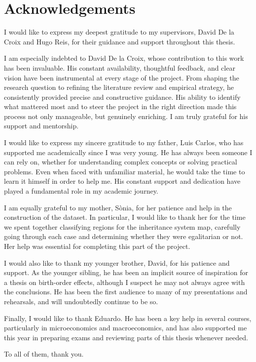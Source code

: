 \setcounter{section}{2}
\section*{Acknowledgements}

I would like to express my deepest gratitude to my supervisors, David De la Croix and Hugo Reis, for their guidance and support throughout this thesis.

I am especially indebted to David De la Croix, whose contribution to this work has been invaluable. His constant availability, thoughtful feedback, and clear vision have been instrumental at every stage of the project. From shaping the research question to refining the literature review and empirical strategy, he consistently provided precise and constructive guidance. His ability to identify what mattered most and to steer the project in the right direction made this process not only manageable, but genuinely enriching. I am truly grateful for his support and mentorship.


I would like to express my sincere gratitude to my father, Luis Carlos, who has supported me academically since I was very young. He has always been someone I can rely on, whether for understanding complex concepts or solving practical problems. Even when faced with unfamiliar material, he would take the time to learn it himself in order to help me. His constant support and dedication have played a fundamental role in my academic journey.

I am equally grateful to my mother, Sònia, for her patience and help in the construction of the dataset. In particular, I would like to thank her for the time we spent together classifying regions for the inheritance system map, carefully going through each case and determining whether they were egalitarian or not. Her help was essential for completing this part of the project.

I would also like to thank my younger brother, David, for his patience and support. As the younger sibling, he has been an implicit source of inspiration for a thesis on birth-order effects, although I suspect he may not always agree with the conclusions. He has been the first audience to many of my presentations and rehearsals, and will undoubtedly continue to be so. 

Finally, I would like to thank Eduardo. He has been a key help in several courses, particularly in microeconomics and macroeconomics, and has also supported me this year in preparing exams and reviewing parts of this thesis whenever needed.

To all of them, thank you.